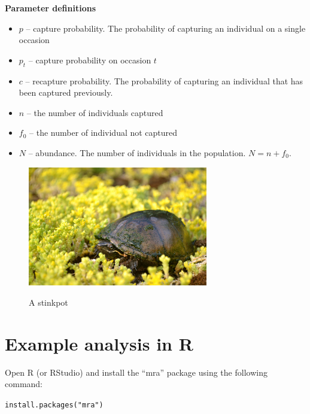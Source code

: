 \documentclass[12pt]{article}\usepackage[]{graphicx}\usepackage[]{color}
\makeatletter
\newcommand{\hlstr}[1]{\textcolor[rgb]{0.749,0.012,0.012}{#1}}%
\newcommand{\hlstd}[1]{\textcolor[rgb]{0,0,0}{#1}}%
\newcommand{\hlkwd}[1]{\textcolor[rgb]{0.004,0.004,0.506}{#1}}%
\newenvironment{kframe}{%
 \def\at@end@of@kframe{}%
 \ifinner\ifhmode%
  \def\at@end@of@kframe{\end{minipage}}%
  \begin{minipage}{\columnwidth}%
 \fi\fi%
 \def\FrameCommand##1{\hskip\@totalleftmargin \hskip-\fboxsep
 \colorbox{shadecolor}{##1}\hskip-\fboxsep
     \hskip-\linewidth \hskip-\@totalleftmargin \hskip\columnwidth}%
 \MakeFramed {\advance\hsize-\width
   \@totalleftmargin\z@ \linewidth\hsize
   \@setminipage}}%
 {\par\unskip\endMakeFramed%
 \at@end@of@kframe}
\newenvironment{knitrout}{}{} %
\makeatother
\begin{document}
\vfill



{\bf Parameter definitions}
\begin{itemize}
  \item $p$ -- capture probability. The probability of capturing an
    individual on a single occasion
  \item $p_t$ -- capture probability on occasion $t$
  \item $c$ -- recapture probability. The probability of capturing an
    individual that has been captured previously.
  \item $n$ -- the number of individuals captured
  \item $f_0$ -- the number of individual not captured
  \item $N$ -- abundance. The number of individuals in the
    population. $N=n+f_0$. 
\end{itemize}

\vfill


\begin{figure}[h!]
  \centering
  \includegraphics[width=0.7\textwidth]{figs/Stinkpot} \\
  \caption{A stinkpot}
\end{figure}



\clearpage


\section*{Example analysis in R}

Open R (or RStudio) and install the ``mra'' package using the
following command: 

\begin{knitrout}
\color{fgcolor}\begin{kframe}
\begin{alltt}
\hlkwd{install.packages}\hlstd{(}\hlstr{"mra"}\hlstd{)}
\end{alltt}
\end{kframe}
\end{knitrout}
\end{document}
